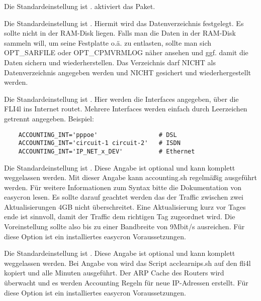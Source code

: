 \begin{description}

Die Standardeinstellung ist .
 aktiviert das Paket.

Die Standardeinstellung ist .
Hiermit wird das Datenverzeichnis festgelegt. Es sollte nicht in der RAM-Disk
liegen.
Falls man die Daten in der RAM-Disk sammeln will, um seine Festplatte o.ä. zu
entlasten, sollte man sich OPT\_SARFILE oder OPT\_CPMVRMLOG näher ansehen
und ggf. damit die Daten sichern und wiederherstellen.
Das Verzeichnis  darf NICHT als Datenverzeichnis angegeben
werden und NICHT gesichert und wiederhergestellt werden.

Die Standardeinstellung ist .
Hier werden die Interfaces angegeben, über die FLI4l ins Internet routet. Mehrere
Interfaces werden einfach durch Leerzeichen getrennt angegeben.
Beispiel:
\begin{example}
\begin{verbatim}
    ACCOUNTING_INT='pppoe'                 # DSL
    ACCOUNTING_INT='circuit-1 circuit-2'   # ISDN
    ACCOUNTING_INT='IP_NET_x_DEV'          # Ethernet
\end{verbatim}
\end{example}

Die Standardeinstellung ist .
Diese Angabe ist optional und kann komplett weggelassen werden.
Mit dieser Angabe kann accounting.sh regelmäßig ausgeführt werden. Für weitere
Informationen zum Syntax bitte die Dokumentation von easycron lesen.
Es sollte darauf geachtet werden das der Traffic zwischen zwei Aktualisierungen
4GB nicht überschreitet. Eine Aktualisierung kurz vor Tages ende ist sinnvoll, damit
der Traffic dem richtigen Tag zugeordnet wird. Die Voreinstellung sollte also bis zu
einer Bandbreite von 9Mbit/s ausreichen.
Für diese Option ist ein installiertes easycron Voraussetzungen.

Die Standardeinstellung ist .
Diese Angabe ist optional und kann komplett weggelassen werden.
Bei Angabe von  wird das Script acclearnips.sh auf den fli4l kopiert und alle
Minuten ausgeführt. Der ARP Cache des
Routers wird überwacht und es werden Accounting Regeln für neue IP-Adressen
erstellt. Für diese Option ist ein installiertes easycron Voraussetzungen.
\end{description}

